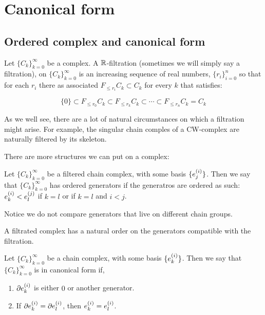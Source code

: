 
\chapter{Canonical form}

%

\section{Ordered complex and canonical form}


\begin{definition}
Let $\{C_k\}_{k=0}^{\infty}$ be a complex. 
A $\mathbb{R}$-filtration (sometimes we will simply say a filtration), on $\{C_k\}_{k=0}^{\infty}$ 
is an increasing sequence of real numbers, $\{r_i\}_{i=0}^n$
so that for each $r_i$ there as associated $F_{\leq r_i}C_k\subset C_k$ for every $k$
that satisfies:

$$
\{0\}\subset
F_{\leq r_0}C_k
\subset
F_{\leq r_k}C_k
\subset
\cdots
\subset
F_{\leq r_n}C_k
=
C_k
$$
\end{definition}

As we well see, there are a lot of natural circumstances on which a filtration might arise. For example, 
the singular chain comples of a CW-complex are naturally filtered by its skeleton.

There are more structures we can put on a complex:


\begin{definition}

Let $\{C_k\}_{k=0}^{\infty}$ be a filtered chain complex, with some basis $\{e_{j}^{(i)}\}$.
Then we say that $\{C_k\}_{k=0}^{\infty}$ has ordered generators if the 
generatros are ordered as such:
$e_{k}^{(i)}<e_{l}^{(j)}$ if  $k=l$ or if $k=l$ and $i<j$.

Notice we do not compare generators that live on different chain groups.
\end{definition}

\begin{remark}
A filtrated complex has a natural order on the generators compatible with the filtration.
\end{remark}


\begin{definition}

Let $\{C_k\}_{k=0}^{\infty}$ be a chain complex, with some basis $\{e_{k}^{(i)}\}$.
Then we say that $\{C_k\}_{k=0}^{\infty}$ is in canonical form if,

\begin{enumerate}
\item $\partial e_{k}^{(i)}$
is either $0$ or another generator.

\item If $\partial e_{k}^{(i)}=\partial e_{l}^{(i)}$,
then $e_{k}^{(i)}= e_{l}^{(i)}$.
\end{enumerate}

\end{definition}

